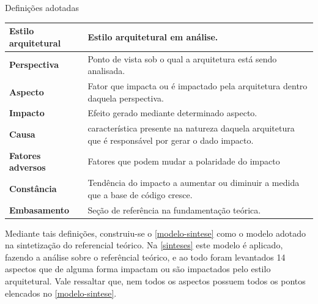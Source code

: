 \begin{quadro}
    \caption{Definições adotadas\label{quad:sintese-definicoes}}
    \begin{tabularx}{\linewidth}{ | p{5cm} | X | }
    \hline
    \textbf{Estilo arquitetural} & Estilo arquitetural em análise. \\ \hline
    \textbf{Perspectiva}         & Ponto de vista sob o qual a arquitetura está sendo analisada. \\ \hline
    \textbf{Aspecto}             & Fator que impacta ou é impactado pela arquitetura dentro daquela perspectiva. \\ \hline
    \textbf{Impacto}             & Efeito gerado mediante determinado aspecto. \\ \hline
    \textbf{Causa}               & característica presente na natureza daquela arquitetura que é responsável por gerar o dado impacto. \\ \hline
    \textbf{Fatores adversos}    & Fatores que podem mudar a polaridade do impacto \\ \hline
    \textbf{Constância}          & Tendência do impacto a aumentar ou diminuir a medida que a base de código cresce. \\ \hline
    \textbf{Embasamento}         & Seção de referência na fundamentação teórica. \\ \hline
    \end{tabularx}
\end{quadro}

Mediante tais definições, construiu-se o \autoref{modelo-sintese} como o modelo adotado na
sintetização do referencial teórico. Na \autoref{sinteses} este modelo é aplicado, fazendo a
análise sobre o referêncial teórico, e ao todo foram levantados 14 aspectos que de alguma forma
impactam ou são impactados pelo estilo arquitetural. Vale ressaltar que, nem todos os aspectos
possuem todos os pontos elencados no \autoref{modelo-sintese}.

